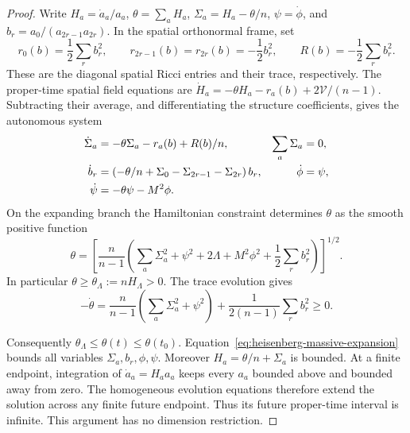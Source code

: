 \documentclass[10pt,a4paper]{article}
\numberwithin{equation}{section}
\theoremstyle{definition}
\theoremstyle{remark}
\begin{document}
\begin{proof}
Write $H_a=\dot a_a/a_a$, $\theta=\sum_aH_a$,
$\Sigma_a=H_a-\theta/n$, $\psi=\dot\phi$, and
$b_r=a_0/(a_{2r-1}a_{2r})$.  In the spatial orthonormal frame, set
\[
 r_0(b)=\frac12\sum_r b_r^2,\qquad
 r_{2r-1}(b)=r_{2r}(b)=-\frac12b_r^2,\qquad
 R(b)=-\frac12\sum_r b_r^2.
\]
These are the diagonal spatial Ricci entries and their trace,
respectively.  The proper-time spatial field equations are
$\dot H_a=-\theta H_a-r_a(b)+2\mathcal V/(n-1)$.
Subtracting their average, and differentiating the structure
coefficients, gives the autonomous system
\begin{align}
 \dot\Sigma_a&=-\theta\Sigma_a-r_a(b)+R(b)/n,
                   &\sum_a\Sigma_a&=0,\notag\\
 \dot b_r&=\left(-\theta/n+
          \Sigma_0-\Sigma_{2r-1}-\Sigma_{2r}\right)b_r,
                   &\dot\phi&=\psi,\notag\\
 \dot\psi&=-\theta\psi-M^2\phi.
 \label{eq:heisenberg-massive-autonomous}
\end{align}
On the expanding branch the Hamiltonian constraint determines
$\theta$ as the smooth positive function
\begin{equation}
 \theta=
 \left[\frac n{n-1}\left(
       \sum_a\Sigma_a^2+\psi^2+2\Lambda+M^2\phi^2
                         +\frac12\sum_r b_r^2\right)\right]^{1/2}.
 \label{eq:heisenberg-massive-expansion}
\end{equation}
In particular $\theta\ge\theta_\Lambda:=nH_\Lambda>0$.
The trace evolution gives
\begin{equation}
 -\dot\theta=
 \frac n{n-1}\left(\sum_a\Sigma_a^2+\psi^2\right)
                +\frac1{2(n-1)}\sum_r b_r^2\ge0.
 \label{eq:heisenberg-massive-lyapunov}
\end{equation}

Consequently $\theta_\Lambda\le\theta(t)\le\theta(t_0)$.
Equation~\eqref{eq:heisenberg-massive-expansion} bounds all variables
$\Sigma_a,b_r,\phi,\psi$.  Moreover $H_a=\theta/n+\Sigma_a$ is
bounded.  At a finite endpoint, integration of $\dot a_a=H_aa_a$
keeps every $a_a$ bounded above and bounded away from zero.
The homogeneous evolution equations therefore extend the solution
across any finite future endpoint.  Thus its future proper-time
interval is infinite.  This argument has no dimension restriction.


\end{proof}
\end{document}
